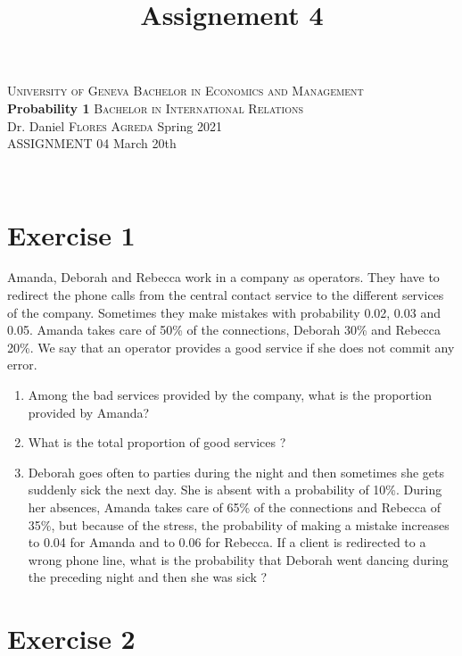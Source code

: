 \documentclass[12pt,thmsa]{article}\usepackage[]{graphicx}\usepackage[]{color}
\title{Assignement 4}
\begin{document}
\noindent \textsc{University of Geneva}     \hfill \textsc{Bachelor in Economics and Management} \\
\textbf{Probability 1}                      \hfill \textsc{Bachelor in International Relations} \\
Dr. Daniel \textsc{Flores Agreda}                 \hfill Spring 2021  \\
ASSIGNMENT 04                               \hfill   March 20th



\noindent
\makebox[\linewidth]{\rule{\textwidth}{0.4pt}}\\[1.5ex]

\section*{Exercise 1}

Amanda, Deborah and Rebecca work in a company as operators. They have to redirect the phone calls from the central contact service to the different services of the company. Sometimes they make mistakes with
probability 0.02, 0.03 and 0.05. Amanda takes care of 50\% of the connections, Deborah 30\% and Rebecca 20\%. We say that an operator provides a good service if she does not commit any error.

\begin{enumerate}
  \item Among the bad services provided by the company, what is the proportion provided by Amanda?
  \item What is the total proportion of good services ?
  \item  Deborah goes often to parties during the night and then sometimes she gets suddenly sick the next day. She is absent with a probability of 10\%.
  During her absences, Amanda takes care of 65\% of the connections and Rebecca of 35\%, but because of the stress, the probability of making a mistake
  increases to 0.04 for Amanda and to 0.06 for Rebecca. If a client is redirected to a wrong phone line, what is the probability that Deborah went dancing during the preceding night and then she was sick ?
\end{enumerate}







\section*{Exercise 2}
\end{document}
